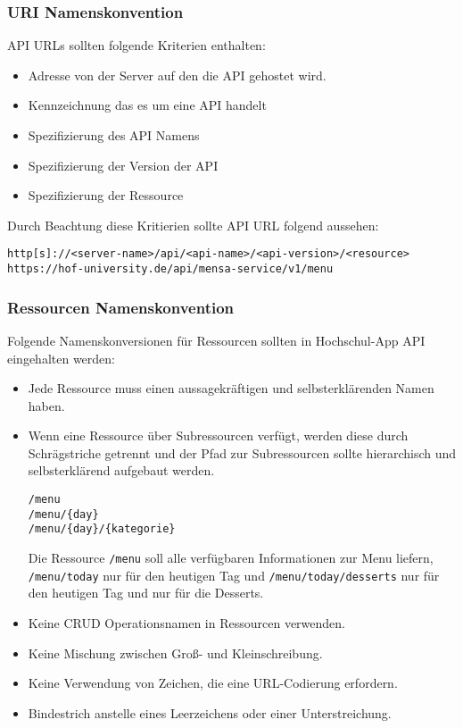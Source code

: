 \subsubsection{URI Namenskonvention}
API URLs sollten folgende Kriterien enthalten:
\begin{itemize}
\item Adresse von der Server auf den die API gehostet wird.
\item Kennzeichnung das es um eine API handelt
\item Spezifizierung des API Namens
\item Spezifizierung der Version der API
\item Spezifizierung der Ressource
\end{itemize}
Durch Beachtung diese Kritierien sollte API URL folgend aussehen:
\begin{verbatim}
http[s]://<server-name>/api/<api-name>/<api-version>/<resource>
https://hof-university.de/api/mensa-service/v1/menu
\end{verbatim}

\subsubsection{Ressourcen Namenskonvention}
Folgende Namenskonversionen für Ressourcen sollten in Hochschul-App API eingehalten werden:

\begin{itemize}
\item Jede Ressource muss einen aussagekräftigen und selbsterklärenden Namen haben. 
\item Wenn eine Ressource über Subressourcen verfügt, werden diese durch Schrägstriche getrennt und der Pfad zur Subressourcen sollte hierarchisch und selbsterklärend aufgebaut werden.
\begin{verbatim}
/menu
/menu/{day}
/menu/{day}/{kategorie}
\end{verbatim}
Die Ressource \verb|/menu| soll alle verfügbaren Informationen zur Menu liefern, \verb|/menu/today| nur für den heutigen Tag und \verb|/menu/today/desserts| nur für den heutigen Tag und nur für die Desserts.
\item Keine CRUD Operationsnamen in Ressourcen verwenden.
\item Keine Mischung zwischen Groß- und Kleinschreibung.
\item Keine Verwendung von Zeichen, die eine URL-Codierung erfordern.
\item Bindestrich anstelle eines Leerzeichens oder einer Unterstreichung.
\end{itemize}


